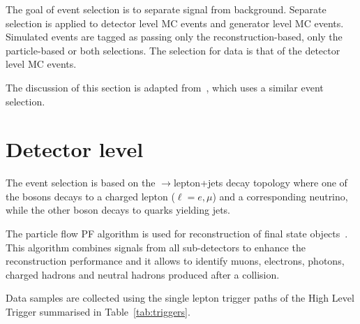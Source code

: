 The goal of event selection is to separate signal from background. Separate selection is applied to detector level MC events and generator level MC events. Simulated events are tagged as passing only the reconstruction-based, only the particle-based or both selections. The selection for data is that of the detector level MC events.

The discussion of this section is adapted from~\cite{CMS-AN-2017-159}, which uses a similar event selection.

\section{Detector level}
\label{sec:detector_level}

The event selection is based on the \ttbar$\to$lepton+jets decay topology where one of the \PW bosons decays to a charged lepton ($\ell=e, \mu$) and a corresponding neutrino, while the other \PW boson decays to quarks yielding jets.

The particle flow PF algorithm is used for reconstruction of final state objects~\cite{Sirunyan:2017ulk}. This algorithm combines signals from all sub-detectors to enhance the reconstruction performance and it allows to identify muons, electrons, photons, charged hadrons and neutral hadrons produced after a \Pp\Pp collision.

Data samples are collected using the single lepton trigger paths of the High Level Trigger summarised in Table~\ref{tab:triggers}.


